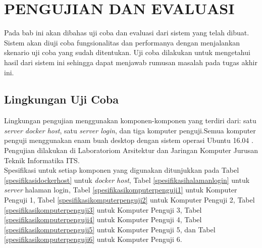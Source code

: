 \chapter{PENGUJIAN DAN EVALUASI}
	Pada bab ini akan dibahas uji coba dan evaluasi dari sistem yang telah dibuat. Sistem akan diuji coba fungsionalitas dan performanya dengan menjalankan skenario uji coba yang sudah ditentukan. Uji coba dilakukan untuk mengetahui hasil dari sistem ini sehingga dapat menjawab rumusan masalah pada tugas akhir ini.    
	
\section{Lingkungan Uji Coba}
	Lingkungan pengujian menggunakan komponen-komponen yang terdiri dari: satu \textit{server docker host}, satu \textit{server login}, dan tiga komputer penguji.Semua komputer penguji menggunakan enam buah desktop dengan sistem operasi Ubuntu 16.04
	. Pengujian dilakukan di Laboratoriom Arsitektur dan Jaringan Komputer Jurusan Teknik Informatika ITS. \\
    \indent Spesifikasi untuk setiap komponen yang digunakan ditunjukkan pada Tabel \ref{spesifikasidockerhost} untuk \textit{docker host}, Tabel \ref{spesifikasihalamanlogin} untuk \textit{server} halaman login, Tabel \ref{spesifikasikomputerpenguji1} untuk Komputer Penguji 1, Tabel \ref{spesifikasikomputerpenguji2} untuk Komputer Penguji 2, Tabel \ref{spesifikasikomputerpenguji3} untuk Komputer Penguji 3, Tabel \ref{spesifikasikomputerpenguji4} untuk Komputer Penguji 4, Tabel \ref{spesifikasikomputerpenguji5} untuk Komputer Penguji 5, dan Tabel \ref{spesifikasikomputerpenguji6} untuk Komputer Penguji 6.

